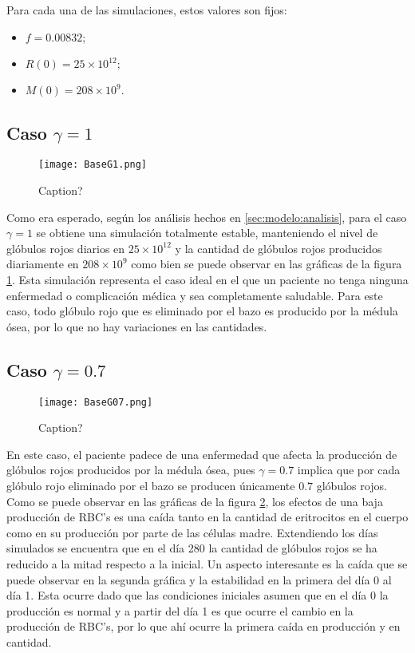 Para cada una de las simulaciones, estos valores son fijos:
\begin{itemize}
    \item $f=0.00832$;
    \item $R(0) = 25\times 10^{12};$
    \item $M(0) = 208 \times 10^{9}.$
\end{itemize}

\subsection{Caso $\gamma=1$}\label{subsec:modelo:simulaciones:G1}
\begin{figure}[H]
    \centering
    \texttt{[image: BaseG1.png]}
    \caption{Caption?}
    \label{sec:modelo:fig:G1}
\end{figure}

Como era esperado, según los análisis hechos en \ref{sec:modelo:analisis}, para el caso $\gamma = 1$ se obtiene una simulación totalmente estable, manteniendo el nivel de glóbulos rojos diarios en $25\times 10^{12}$ y la cantidad de glóbulos rojos producidos diariamente en $208\times 10^{9}$ como bien se puede observar en las gráficas de la figura \ref{sec:modelo:fig:G1}. Esta simulación representa el caso ideal en el que un paciente no tenga ninguna enfermedad o complicación médica y sea completamente saludable. Para este caso, todo glóbulo rojo que es eliminado por el bazo es producido por la médula ósea, por lo que no hay variaciones en las cantidades.

\subsection{Caso $\gamma=0.7$}
\begin{figure}[H]
    \centering
    \texttt{[image: BaseG07.png]}
    \caption{Caption?}
    \label{sec:modelo:fig:G07}
\end{figure}

En este caso, el paciente padece de una enfermedad que afecta la producción de glóbulos rojos producidos por la médula ósea, pues $\gamma=0.7$ implica que por cada glóbulo rojo eliminado por el bazo se producen únicamente $0.7$ glóbulos rojos. Como se puede observar en las gráficas de la figura \ref{sec:modelo:fig:G07}, los efectos de una baja producción de RBC's es una caída tanto en la cantidad de eritrocitos en el cuerpo como en su producción por parte de las células madre. Extendiendo los días simulados se encuentra que en el día 280 la cantidad de glóbulos rojos se ha reducido a la mitad respecto a la inicial. Un aspecto interesante es la caída que se puede observar en la segunda gráfica y la estabilidad en la primera del día 0 al día 1. Esta ocurre dado que las condiciones iniciales asumen que en el día 0 la producción es normal y a partir del día 1 es que ocurre el cambio en la producción de RBC's, por lo que ahí ocurre la primera caída en producción y en cantidad. 


